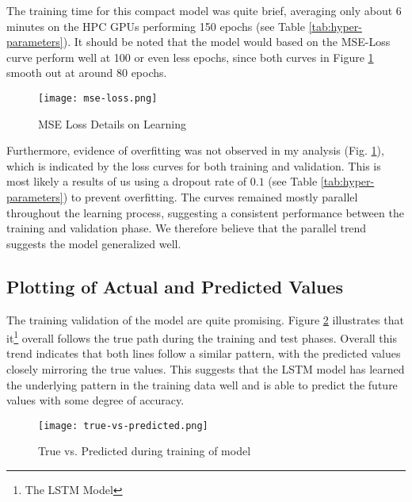 \documentclass[10pt, conference, compsoc]{IEEEtran}
\begin{document}
The training time for this compact model was quite brief, averaging only about 6 minutes on the HPC GPUs performing 150 epochs (see Table \ref{tab:hyper-parameters}). It should be noted that the model would based on the MSE-Loss curve perform well at 100 or even less epochs, since both curves in Figure \ref{fig:mse-loss} smooth out at around 80 epochs.

\begin{figure}[h]
\centering
\captionsetup{justification=centering,margin=1cm}
\texttt{[image: mse-loss.png]}
\caption{MSE Loss Details on Learning}
\label{fig:mse-loss}
\end{figure}

Furthermore, evidence of overfitting was not observed in my analysis (Fig. \ref{fig:mse-loss}), which is indicated by the loss curves for both training and validation. This is most likely a results of us using a dropout rate of $0.1$ (see Table \ref{tab:hyper-parameters}) to prevent overfitting. The curves remained mostly parallel throughout the learning process, suggesting a consistent performance between the training and validation phase. We therefore believe that the parallel trend suggests the model generalized well.


\subsection{Plotting of Actual and Predicted Values}
The training validation of the model are quite promising. Figure \ref{fig:true-vs-predicted} illustrates that it\footnote{The LSTM Model} overall follows the true path during the training and test phases. Overall this trend indicates that both lines follow a similar pattern, with the predicted values closely mirroring the true values. This suggests that the LSTM model has learned the underlying pattern in the training data well and is able to predict the future values with some degree of accuracy.

\begin{figure}[h]
\centering
\captionsetup{justification=centering,margin=1cm}
\texttt{[image: true-vs-predicted.png]}
\caption{True vs. Predicted during training of model}
\label{fig:true-vs-predicted}
\end{figure}
\end{document}
